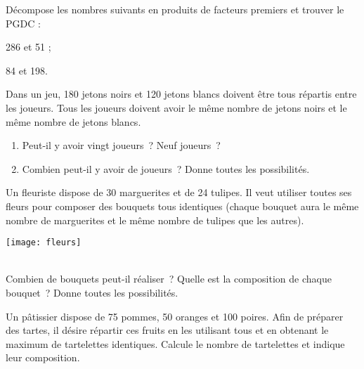 \begin{exercice}
Décompose les nombres suivants en produits de facteurs premiers et trouver le PGDC :
\begin{colenumerate}{2}
 \item 286 et 51 ;
 \item 84 et 198.
 \end{colenumerate}
\end{exercice} 

\begin{exercice}
Dans un jeu, 180 jetons noirs et 120 jetons blancs doivent être tous répartis entre les joueurs. Tous les joueurs doivent avoir le même nombre de jetons noirs et le même nombre de jetons blancs.
\begin{enumerate}
 \item Peut-il y avoir vingt joueurs ? Neuf joueurs ?
 \item Combien peut-il y avoir de joueurs ? Donne toutes les possibilités.
 \end{enumerate}
\end{exercice} 

\begin{exercice}

\vspace{1em}

\begin{minipage}[c]{0.66\linewidth}
Un fleuriste dispose de 30 marguerites et de 24 tulipes. Il veut utiliser toutes ses fleurs pour composer des bouquets tous identiques (chaque bouquet aura le même nombre de marguerites et le même nombre de tulipes que les autres).
 \end{minipage}\hfill%
 \begin{minipage}[c]{0.26\linewidth}
 \texttt{[image: fleurs]}
  \end{minipage} \\[1em]
 Combien de bouquets peut-il réaliser ? Quelle est la composition de chaque bouquet ? Donne toutes les possibilités.
\end{exercice} 

\begin{exercice}[Le pâtissier]
Un pâtissier dispose de 75 pommes, 50 oranges et 100 poires. Afin de préparer des tartes, il désire répartir ces fruits en les utilisant tous et en obtenant le maximum de tartelettes identiques. Calcule le nombre de tartelettes et indique leur composition.
\end{exercice}

